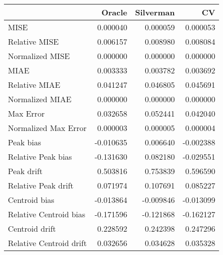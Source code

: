 \begin{tabular}{lrrr}
  \hline
 & Oracle & Silverman & CV \\ 
  \hline
MISE & 0.000040 & 0.000059 & 0.000053 \\ 
  Relative MISE & 0.006157 & 0.008980 & 0.008084 \\ 
  Normalized MISE & 0.000000 & 0.000000 & 0.000000 \\ 
  MIAE & 0.003333 & 0.003782 & 0.003692 \\ 
  Relative MIAE & 0.041247 & 0.046805 & 0.045691 \\ 
  Normalized MIAE & 0.000000 & 0.000000 & 0.000000 \\ 
  Max Error & 0.032658 & 0.052441 & 0.042040 \\ 
  Normalized Max Error & 0.000003 & 0.000005 & 0.000004 \\ 
  Peak bias & -0.010635 & 0.006640 & -0.002388 \\ 
  Relative Peak bias & -0.131630 & 0.082180 & -0.029551 \\ 
  Peak drift & 0.503816 & 0.753839 & 0.596590 \\ 
  Relative Peak drift & 0.071974 & 0.107691 & 0.085227 \\ 
  Centroid bias & -0.013864 & -0.009846 & -0.013099 \\ 
  Relative Centroid bias & -0.171596 & -0.121868 & -0.162127 \\ 
  Centroid drift & 0.228592 & 0.242398 & 0.247296 \\ 
  Relative Centroid drift & 0.032656 & 0.034628 & 0.035328 \\ 
   \hline
\end{tabular}
